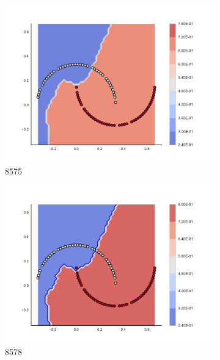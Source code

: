 \begin{figure}[h]
\begin{subfigure}[b]{0.09\textwidth}
    \includegraphics[clip, trim=2.35cm 1.75cm 4.5cm 0cm,width=\textwidth]{img/convergence/8575.pdf}
    \caption{8575}
    \label{fig:convergence_8575}
\end{subfigure}
%
\begin{subfigure}[b]{0.09\textwidth}
    \includegraphics[clip, trim=2.35cm 1.75cm 4.5cm 0cm,width=\textwidth]{img/convergence/8578.pdf}
    \caption{8578}
    \label{fig:convergence_8578}
\end{subfigure}
%
\begin{subfigure}[b]{0.09\textwidth}

\end{subfigure}
\end{figure}
